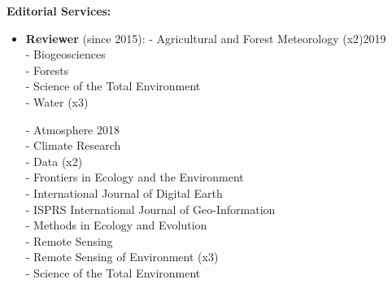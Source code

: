 \documentclass[10pt]{article}
\newenvironment{changemargin}[2]{%
  \begin{list}{}{%
 \setlength{\topsep}{0pt}%
 \setlength{\leftmargin}{#1}%
 \setlength{\rightmargin}{#2}%
 \setlength{\listparindent}{\parindent}%
 \setlength{\itemindent}{\parindent}%
 \setlength{\parsep}{\parskip}%
  }%
  \item[]}{\end{list}
}
\newenvironment{body} {
  \vspace*{-2pt}
  \begin{changemargin}{-0.5in}{-0.5in}
}
{\end{changemargin}
}
\begin{document}
\begin{body}

  \textbf{Editorial Services:} \\
  \vspace*{-4pt}
  \begin{itemize} \itemsep -0pt
    \item[] \textbf {Reviewer} (since 2015):
          \newline
          \hspace*{8pt}  - Agricultural and Forest Meteorology (x2)\hfill {2019} \\
          \hspace*{8pt}  - Biogeosciences \\
          \hspace*{8pt}  - Forests \\
          \hspace*{8pt}  - Science of the Total Environment \\
          \hspace*{8pt}  - Water (x3) \\
          \bigskip

          \hspace*{8pt}  - Atmosphere \hfill {2018} \\
          \hspace*{8pt}  - Climate Research\\
          \hspace*{8pt}  - Data (x2) \\
          \hspace*{8pt}  - Frontiers in Ecology and the Environment \\
          \hspace*{8pt}  - International Journal of Digital Earth \\
          \hspace*{8pt}  - ISPRS International Journal of Geo-Information\\
          \hspace*{8pt}  - Methods in Ecology and Evolution\\
          \hspace*{8pt}  - Remote Sensing\\
          \hspace*{8pt}  - Remote Sensing of Environment (x3)\\
          \hspace*{8pt}  - Science of the Total Environment\\
          \bigskip


\end{itemize}
\end{body}
\end{document}
